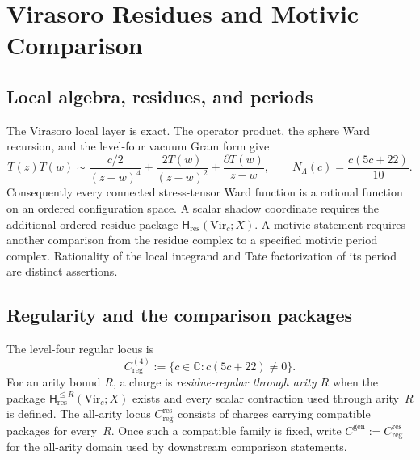 
\providecommand{\MZV}{\mathrm{MZV}}
\providecommand{\mot}{\mathrm{mot}}
\providecommand{\Vir}{\mathrm{Vir}}
\providecommand{\Walg}{\mathcal W}
\providecommand{\cA}{\mathcal A}
\providecommand{\ClaimStatusDefinitional}{}
\providecommand{\ClaimStatusConditional}{}
\providecommand{\ClaimStatusOpen}{}

\chapter{Virasoro Residues and Motivic Comparison}
\label{ch:virasoro-motivic-purity}

\section*{Local algebra, residues, and periods}

The Virasoro local layer is exact.  The operator product, the sphere
Ward recursion, and the level-four vacuum Gram form give
\[
 T(z)T(w)\sim \frac{c/2}{(z-w)^4}
 +\frac{2T(w)}{(z-w)^2}+\frac{\partial T(w)}{z-w},
 \qquad
 N_\Lambda(c)=\frac{c(5c+22)}{10}.
\]
Consequently every connected stress-tensor Ward function is a
rational function on an ordered configuration space.  A scalar
shadow coordinate requires the additional ordered-residue package
\(\mathsf H_{\mathrm{res}}(\Vir_c;X)\).  A motivic statement requires
another comparison from the residue complex to a specified motivic
period complex.  Rationality of the local integrand and Tate
factorization of its period are distinct assertions.

\section{Regularity and the comparison packages}
\label{sec:vmp-setup}

\begin{definition}
\ClaimStatusDefinitional
\label{def:vmp-generic-c}
The level-four regular locus is
\[
 C^{(4)}_{\mathrm{reg}}
 :=\{c\in\mathbb C: c(5c+22)\ne0\}.
\]
For an arity bound \(R\), a charge is
\emph{residue-regular through arity \(R\)} when the package
\(\mathsf H_{\mathrm{res}}^{\le R}(\Vir_c;X)\) exists and every
scalar contraction used through arity~\(R\) is defined.  The
all-arity locus \(C^{\mathrm{res}}_{\mathrm{reg}}\) consists of
charges carrying compatible packages for every~\(R\).
Once such a compatible family is fixed, write
\(C^{\mathrm{gen}}:=C^{\mathrm{res}}_{\mathrm{reg}}\) for the
all-arity domain used by downstream comparison statements.
\end{definition}

